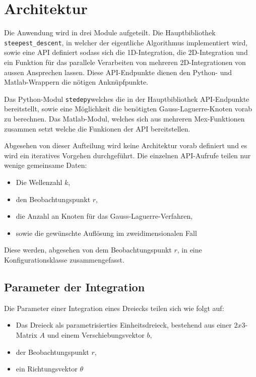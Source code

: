 \section{Architektur}

Die Anwendung wird in drei Module aufgeteilt. 
Die Hauptbibliothek \texttt{steepest\_descent}, in welcher der eigentliche Algorithmus implementiert wird, sowie eine API definiert sodass sich die 1D-Integration, die 2D-Integration und ein Funktion für das parallele Verarbeiten von mehreren 2D-Integrationen von aussen Ansprechen lassen.
Diese API-Endpunkte dienen den Python- und Matlab-Wrappern die nötigen Anknüpfpunkte. 

Das Python-Modul \texttt{stedepy}welches die in der Hauptbibliothek API-Endpunkte bereitstellt, sowie eine Möglichkeit die benötigten Gauss-Laguerre-Knoten vorab zu berechnen.
Das Matlab-Modul, welches sich aus mehreren Mex-Funktionen zusammen setzt welche die Funkionen der API bereitstellen.


Abgesehen von dieser Aufteilung wird keine Architektur vorab definiert und es wird ein iteratives Vorgehen durchgeführt.
Die einzelnen API-Aufrufe teilen nur wenige gemeinsame Daten:
\begin{itemize}
    \item Die Wellenzahl $k$,
    \item den Beobachtungspunkt $r$,
    \item die Anzahl an Knoten für das Gauss-Laguerre-Verfahren,
    \item sowie die gewünschte Auflösung im zweidimensionalen Fall
\end{itemize}
Diese werden, abgesehen von dem Beobachtungspunkt $r$, in eine Konfigurationsklasse zusammengefasst.


\subsection{Parameter der Integration}

Die Parameter einer Integration eines Dreiecks teilen sich wie folgt auf:

\begin{itemize}
    \item Das Dreieck als parametrisierties Einheitsdreieck, bestehend aus einer $2x3$-Matrix $A$ und einem Verschiebungsvektor $b$,
    \item der Beobachtungspunkt $r$,
    \item ein Richtungsvektor $\theta$
\end{itemize}

